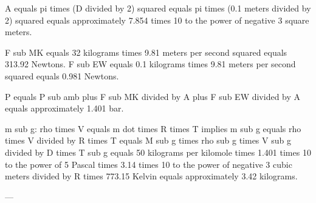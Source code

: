 A equals pi times (D divided by 2) squared equals pi times (0.1 meters divided by 2) squared equals approximately 7.854 times 10 to the power of negative 3 square meters.  

F sub MK equals 32 kilograms times 9.81 meters per second squared equals 313.92 Newtons.  
F sub EW equals 0.1 kilograms times 9.81 meters per second squared equals 0.981 Newtons.  

P equals P sub amb plus F sub MK divided by A plus F sub EW divided by A equals approximately 1.401 bar.  

m sub g:  
rho times V equals m dot times R times T implies m sub g equals rho times V divided by R times T equals M sub g times rho sub g times V sub g divided by D times T sub g equals 50 kilograms per kilomole times 1.401 times 10 to the power of 5 Pascal times 3.14 times 10 to the power of negative 3 cubic meters divided by R times 773.15 Kelvin equals approximately 3.42 kilograms.  

---
